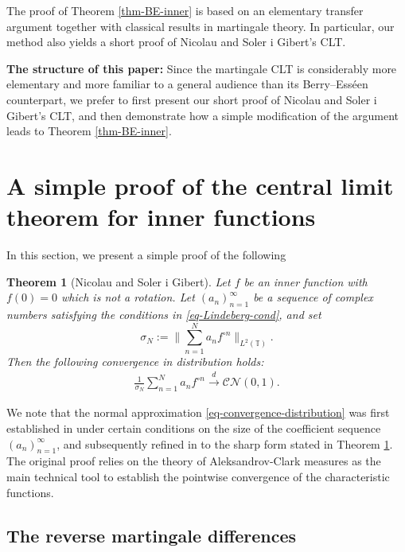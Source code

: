 \documentclass[11pt, reqno]{amsart}
\newtheorem{theorem}{Theorem}
\theoremstyle{definition}
\newtheorem*{Brown-Eagleson Theorem}{The Brown-Eagleson Theorem}
\newcommand{\T}{\mathbb T}
\newcommand{\cal}{\mathcal}
\begin{document}


	The proof of Theorem \ref{thm-BE-inner} is based on an elementary transfer argument together with classical results in martingale theory. In particular, our method also yields a short proof of Nicolau and Soler i Gibert's CLT. 

	\noindent\textbf{The structure of this paper:} Since the martingale CLT is considerably more elementary and more familiar to a general audience than its Berry--Ess\'{e}en counterpart, we prefer to first present our short proof of Nicolau and Soler i Gibert's CLT, and then demonstrate how a simple modification of the argument leads to Theorem \ref{thm-BE-inner}.


	\section{A simple proof of the central limit theorem for inner functions}


	In this section, we present a simple proof of the following

		\begin{theorem}[Nicolau and Soler i Gibert]\label{thm-NS}
		Let $f$ be an inner function with $f(0)=0$ which is not a rotation. Let $(a_n)_{n=1}^\infty$ be a sequence of complex numbers satisfying the conditions in \eqref{eq-Lindeberg-cond}, and set $$\sigma_N:= \bigg\| \sum_{n=1}^N a_n f^{\circ n }\bigg\|_{L^2(\T)}.$$ Then the following convergence in distribution holds: 
		\begin{align}\label{eq-convergence-distribution}\frac{1}{\sigma_N} \sum_{n=1}^N a_n f^{\circ n }\stackrel{d}{\longrightarrow} \cal{CN}(0,1).
		\end{align}
	\end{theorem}

	We note that the normal approximation \eqref{eq-convergence-distribution} was first established in \cite{NS22} under certain conditions on the size of the coefficient sequence $(a_n)_{n=1}^\infty$, and subsequently refined in \cite{NS24} to the sharp form stated in Theorem \ref{thm-NS}. The original proof relies on the theory of Aleksandrov-Clark measures as the main technical tool to establish the pointwise convergence of the characteristic functions.



	\subsection{The reverse martingale differences}
	
\end{document}
